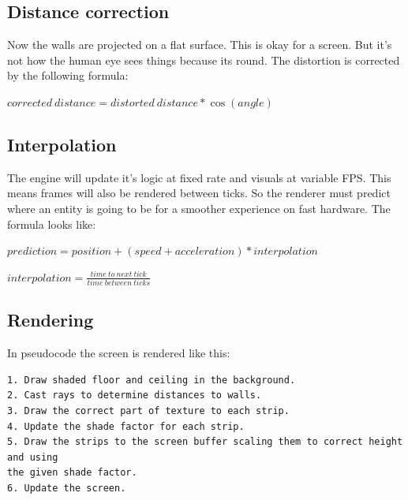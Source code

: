 \documentclass[a4paper,10pt]{article}
\begin{document}
\subsection{Distance correction}

Now the walls are projected on a flat surface. This is okay for a
screen. But it's not how the human eye sees things because its round.
The distortion is corrected by the following formula:

\begin{center}
$corrected\: distance=distorted\: distance*\cos(angle)$\\

\par\end{center}

\subsection{Interpolation}

The engine will update it's logic at fixed rate and visuals at variable
FPS. This means frames will also be rendered between ticks. So the
renderer must predict where an entity is going to be for a smoother
experience on fast hardware. The formula looks like:

\begin{center}
$prediction=position+(speed+acceleration)*interpolation$
\par\end{center}

\begin{center}
$interpolation=\frac{time\: to\: next\: tick}{time\: between\: ticks}$\\
\par\end{center}

\subsection{Rendering}

In pseudocode the screen is rendered like this:

\begin{verbatim}
1. Draw shaded floor and ceiling in the background.
2. Cast rays to determine distances to walls.
3. Draw the correct part of texture to each strip.
4. Update the shade factor for each strip.
5. Draw the strips to the screen buffer scaling them to correct height and using
the given shade factor.
6. Update the screen.
\end{verbatim}
\end{document}
